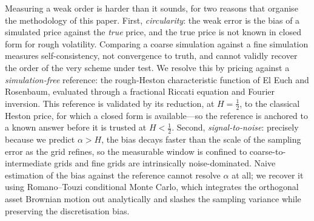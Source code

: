 \documentclass{siamonline250211}
\begin{document}
Measuring a weak order is harder than it sounds, for two reasons that organise the
methodology of this paper. First, \emph{circularity}: the weak error is the bias of
a simulated price against the \emph{true} price, and the true price is not known in
closed form for rough volatility. Comparing a coarse simulation against a fine
simulation measures self-consistency, not convergence to truth, and cannot validly
recover the order of the very scheme under test. We resolve this by pricing against
a \emph{simulation-free} reference: the rough-Heston characteristic function of El
Euch and Rosenbaum, evaluated through a fractional Riccati equation and Fourier
inversion. This reference is validated by its reduction, at $H=\tfrac12$, to the
classical Heston price, for which a closed form is available---so the reference is
anchored to a known answer before it is trusted at $H<\tfrac12$. Second,
\emph{signal-to-noise}: precisely because we predict $\alpha > H$, the bias decays
faster than the scale of the sampling error as the grid refines, so the measurable
window is confined to coarse-to-intermediate grids and fine grids are intrinsically
noise-dominated. Naive estimation of the bias against the reference cannot resolve
$\alpha$ at all; we recover it using Romano--Touzi conditional Monte Carlo, which
integrates the orthogonal asset Brownian motion out analytically and slashes the
sampling variance while preserving the discretisation bias.
\end{document}
